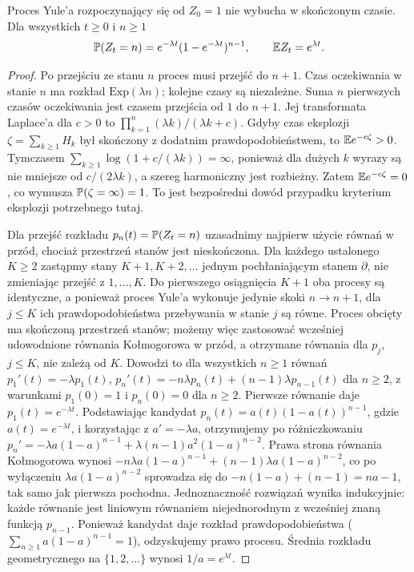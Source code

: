 \begin{twierdzenie}
Proces Yule'a rozpoczynający się od $Z_0=1$ nie wybucha
w skończonym czasie. Dla wszystkich $t\ge0$ i $n\ge1$
\[
\mathbb{P}(Z_t=n)=e^{-\lambda t}(1-e^{-\lambda t})^{n-1},
\qquad \mathbb{E} Z_t=e^{\lambda t}.
\]
\end{twierdzenie}
\begin{proof}
Po przejściu ze stanu $n$ proces musi przejść do $n+1$.
Czas oczekiwania w stanie $n$ ma rozkład
$\mathrm{Exp}(\lambda n)$; kolejne czasy są niezależne.
Suma $n$ pierwszych czasów oczekiwania jest czasem przejścia
od $1$ do $n+1$. Jej transformata Laplace'a dla $c>0$ to
$\prod_{k=1}^n (\lambda k)/(\lambda k+c)$.
Gdyby czas eksplozji $\zeta=\sum_{k\ge1}H_k$ był
skończony z dodatnim prawdopodobieństwem, to
$\mathbb{E} e^{-c\zeta}>0$. Tymczasem
$\sum_{k\ge1}\log(1+c/(\lambda k))=\infty$,
ponieważ dla dużych $k$ wyrazy są nie mniejsze od
$c/(2\lambda k)$, a szereg harmoniczny jest rozbieżny.
Zatem $\mathbb{E} e^{-c\zeta}=0$, co wymusza
$\mathbb{P}(\zeta=\infty)=1$. To jest bezpośredni dowód
przypadku kryterium eksplozji potrzebnego tutaj.

Dla przejść rozkładu $p_n(t)=\mathbb{P}(Z_t=n)$
uzasadnimy najpierw użycie równań w przód, chociaż przestrzeń
stanów jest nieskończona. Dla każdego ustalonego $K\ge2$
zastąpmy stany $K+1,K+2,\ldots$ jednym pochłaniającym
stanem $\partial$, nie zmieniając przejść z $1,\ldots,K$.
Do pierwszego osiągnięcia $K+1$ oba procesy są identyczne,
a ponieważ proces Yule'a wykonuje jedynie skoki $n\to n+1$,
dla $j\le K$ ich prawdopodobieństwa przebywania w stanie $j$
są równe. Proces obcięty ma skończoną przestrzeń stanów;
możemy więc zastosować wcześniej udowodnione równania
Kołmogorowa w przód, a otrzymane równania dla $p_j$, $j\le K$,
nie zależą od $K$. Dowodzi to dla wszystkich $n\ge1$ równań
$p_1'(t)=-\lambda p_1(t)$,
$p_n'(t)=-n\lambda p_n(t)+(n-1)\lambda p_{n-1}(t)$ dla $n\ge2$,
z warunkami $p_1(0)=1$ i $p_n(0)=0$ dla $n\ge2$.
Pierwsze równanie daje $p_1(t)=e^{-\lambda t}$.
Podstawiając kandydat
$p_n(t)=a(t)(1-a(t))^{n-1}$, gdzie $a(t)=e^{-\lambda t}$,
i korzystając z $a'=-\lambda a$, otrzymujemy po różniczkowaniu
$p_n'=-\lambda a(1-a)^{n-1}+\lambda(n-1)a^2(1-a)^{n-2}$.
Prawa strona równania Kołmogorowa wynosi
$-n\lambda a(1-a)^{n-1}+(n-1)\lambda a(1-a)^{n-2}$,
co po wyłączeniu $\lambda a(1-a)^{n-2}$ sprowadza się do
$-n(1-a)+(n-1)=na-1$,
tak samo jak pierwsza pochodna.
Jednoznaczność rozwiązań wynika indukcyjnie: każde równanie
jest liniowym równaniem niejednorodnym z wcześniej znaną
funkcją $p_{n-1}$. Ponieważ kandydat daje rozkład
prawdopodobieństwa ($\sum_{n\ge1}a(1-a)^{n-1}=1$),
odzyskujemy prawo procesu. Średnia rozkładu
geometrycznego na $\{1,2,\ldots\}$ wynosi $1/a=e^{\lambda t}$.
\end{proof}


